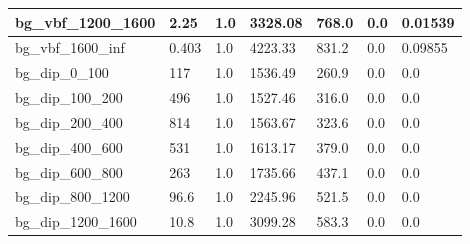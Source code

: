 \documentclass[a4paper, 10pt]{article}
\begin{document}
\begin{table}[H]
\begin{center}
\begin{tabular}{|m{23.0mm}|m{23.0mm}|m{18.0mm}|m{19.0mm}|m{19.0mm}|m{19.0mm}|m{19.0mm}|}
      \hline
      {\cellcolor{white}         bg\_vbf\_1200\_1600}& {\cellcolor{white}         2.25}& {\cellcolor{white}         1.0}& {\cellcolor{white}         3328.08}& {\cellcolor{white}         768.0}& {\cellcolor{green}         0.0}& {\cellcolor{green}         0.01539}\\
      \hline
      {\cellcolor{white}         bg\_vbf\_1600\_inf}& {\cellcolor{white}         0.403}& {\cellcolor{white}         1.0}& {\cellcolor{white}         4223.33}& {\cellcolor{white}         831.2}& {\cellcolor{green}         0.0}& {\cellcolor{green}         0.09855}\\
      \hline
      {\cellcolor{white}         bg\_dip\_0\_100}& {\cellcolor{white}         117}& {\cellcolor{white}         1.0}& {\cellcolor{white}         1536.49}& {\cellcolor{white}         260.9}& {\cellcolor{green}         0.0}& {\cellcolor{green}         0.0}\\
      \hline
      {\cellcolor{white}         bg\_dip\_100\_200}& {\cellcolor{white}         496}& {\cellcolor{white}         1.0}& {\cellcolor{white}         1527.46}& {\cellcolor{white}         316.0}& {\cellcolor{green}         0.0}& {\cellcolor{green}         0.0}\\
      \hline
      {\cellcolor{white}         bg\_dip\_200\_400}& {\cellcolor{white}         814}& {\cellcolor{white}         1.0}& {\cellcolor{white}         1563.67}& {\cellcolor{white}         323.6}& {\cellcolor{green}         0.0}& {\cellcolor{green}         0.0}\\
      \hline
      {\cellcolor{white}         bg\_dip\_400\_600}& {\cellcolor{white}         531}& {\cellcolor{white}         1.0}& {\cellcolor{white}         1613.17}& {\cellcolor{white}         379.0}& {\cellcolor{green}         0.0}& {\cellcolor{green}         0.0}\\
      \hline
      {\cellcolor{white}         bg\_dip\_600\_800}& {\cellcolor{white}         263}& {\cellcolor{white}         1.0}& {\cellcolor{white}         1735.66}& {\cellcolor{white}         437.1}& {\cellcolor{green}         0.0}& {\cellcolor{green}         0.0}\\
      \hline
      {\cellcolor{white}         bg\_dip\_800\_1200}& {\cellcolor{white}         96.6}& {\cellcolor{white}         1.0}& {\cellcolor{white}         2245.96}& {\cellcolor{white}         521.5}& {\cellcolor{green}         0.0}& {\cellcolor{green}         0.0}\\
      \hline
      {\cellcolor{white}         bg\_dip\_1200\_1600}& {\cellcolor{white}         10.8}& {\cellcolor{white}         1.0}& {\cellcolor{white}         3099.28}& {\cellcolor{white}         583.3}& {\cellcolor{green}         0.0}& {\cellcolor{green}         0.0}\\

\end{tabular}
\end{center}
\end{table}
\end{document}
